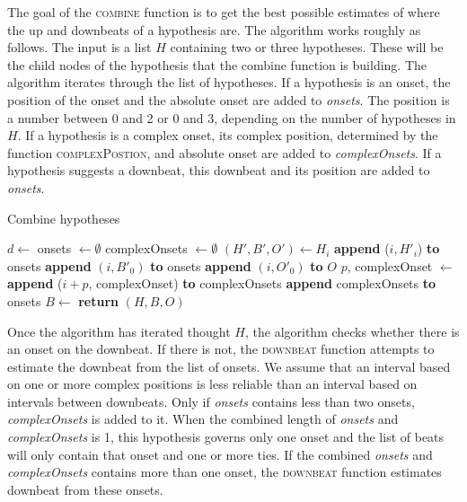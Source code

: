 The goal of the \textsc{combine} function is to get the best possible estimates of where the up and downbeats of a hypothesis are. The algorithm works roughly as follows. The input is a list $H$ containing two or three hypotheses. These will be the child nodes of the hypothesis that the combine function is building. The algorithm iterates through the list of hypotheses. If a hypothesis is an onset, the position of the onset and the absolute onset are added to \textit{onsets}. The position is a number between 0 and 2 or 0 and 3, depending on the number of hypotheses in $H$. If a hypothesis is a complex onset, its complex position, determined by the function \textsc{complexPostion}, and absolute onset are added to \textit{complexOnsets}. If a hypothesis suggests a downbeat, this downbeat and its position are added to \textit{onsets}.

\begin{algorithm}
\caption{Combine hypotheses}
\label{alg:combination}
\begin{algorithmic}
	\State $d \leftarrow$ 
	\State onsets $\leftarrow \emptyset$
	\State complexOnsets $\leftarrow \emptyset$
		\State $(H', B', O') \leftarrow H_i$
			\State \textbf{append} ($i, H'_i$) \textbf{to} onsets
		\Else
				\State \textbf{append} $(i, B'_0)$ \textbf{to} onsets
				\State \textbf{append} $(i, O'_0)$ \textbf{to} $O$
			\EndIf
			\Else
				\State $p$, complexOnset $\leftarrow$ 
				\State \textbf{append} ($i + p$, complexOnset) \textbf{to} complexOnsets
			\EndIf
		\EndIf
	\EndFor
		\State \textbf{append} complexOnsets \textbf{to} onsets
	\EndIf
	\State $B \leftarrow$ 
	\State \textbf{return} $(H, B, O)$
\EndFunction
\end{algorithmic}
\end{algorithm}

Once the algorithm has iterated thought $H$, the algorithm checks whether there is an onset on the downbeat. If there is not, the \textsc{downbeat} function attempts to estimate the downbeat from the list of onsets. We assume that an interval based on one or more complex positions is less reliable than an interval based on intervals between downbeats. Only if \textit{onsets} contains less than two onsets, \textit{complexOnsets} is added to it. When the combined length of \textit{onsets} and \textit{complexOnsets} is 1, this hypothesis governs only one onset and the list of beats will only contain that onset and one or more ties. If the combined \textit{onsets} and \textit{complexOnsets} contains more than one onset, the \textsc{downbeat} function estimates downbeat from these onsets.

